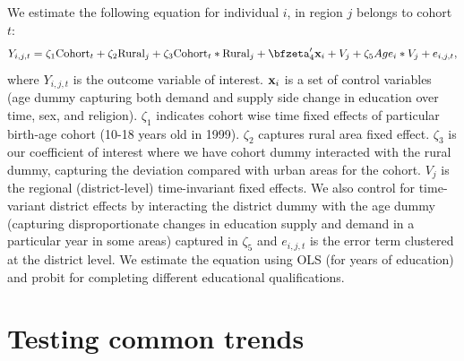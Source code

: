 \documentclass[12pt,letterpaper]{article}
\newcommand{\bfx}{\ensuremath{\mbox{\bf x}}}
\newcommand{\0}{\ensuremath{\mbox{\boldmath $0$}}}
\begin{document}


We estimate the following equation for individual $i$, in region $j$ belongs to cohort $t$:
\begin{equation}
Y_{i,j,t} = \zeta_{1}\textnormal{Cohort}_{t}+
\zeta_{2}\textnormal{Rural}_{j}+ \zeta_{3}\textnormal{Cohort}_{t}*\textnormal{Rural}_{j}+
\bfzeta'_{4}\bfx_{i}+V_{j}+\zeta_{5}Age_{i}*{V}_{j}+e_{i,j,t},
\label{longruneqn}
\end{equation}
where $Y_{i,j,t}$ is the outcome variable of interest. $\bfx_{i}$ is a set of control variables (age dummy capturing both demand and supply side change in education over time, sex, and religion). $\zeta_{1}$ indicates cohort wise time fixed effects of particular birth-age cohort (10-18 years old in 1999). $\zeta_{2}$ captures rural area fixed effect. $\zeta_{3}$ is our coefficient of interest where we have cohort dummy interacted with the rural dummy, capturing the deviation compared with urban areas for the cohort. $V_{j}$ is the regional (district-level) time-invariant fixed effects.  We also control for time-variant district effects by interacting the district dummy with the age dummy (capturing disproportionate changes in education supply and demand in a particular year in some areas) captured in $\zeta_{5}$ and $e_{i,j,t}$ is the error term clustered at the district level. We estimate the equation using OLS (for years of education) and probit for completing different educational qualifications. 

\section{Testing common trends}
\end{document}
